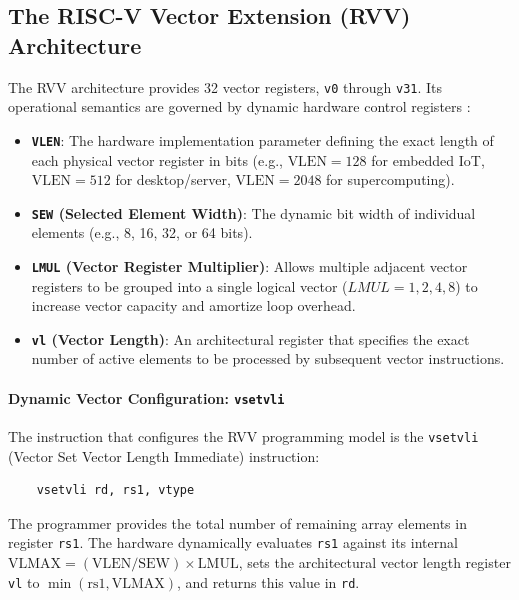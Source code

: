 \subsection{The RISC-V Vector Extension (RVV) Architecture}
The RVV architecture provides 32 vector registers, \texttt{v0} through \texttt{v31}. Its operational semantics are governed by dynamic hardware control registers  \cite{riscv-spec}:
\begin{itemize}
    \item \textbf{\texttt{VLEN}}: The hardware implementation parameter defining the exact length of each physical vector register in bits (e.g., $\text{VLEN} = 128$ for embedded IoT, $\text{VLEN} = 512$ for desktop/server, $\text{VLEN} = 2048$ for supercomputing).
    \item \textbf{\texttt{SEW} (Selected Element Width)}: The dynamic bit width of individual elements (e.g., 8, 16, 32, or 64 bits).
    \item \textbf{\texttt{LMUL} (Vector Register Multiplier)}: Allows multiple adjacent vector registers to be grouped into a single logical vector ($LMUL = 1, 2, 4, 8$) to increase vector capacity and amortize loop overhead.
    \item \textbf{\texttt{vl} (Vector Length)}: An architectural register that specifies the exact number of active elements to be processed by subsequent vector instructions.
\end{itemize}

\paragraph{Dynamic Vector Configuration: \texttt{vsetvli}}
The instruction that configures the RVV programming model is the \texttt{vsetvli} (Vector Set Vector Length Immediate) instruction:
\begin{verbatim}
    vsetvli rd, rs1, vtype
\end{verbatim}
The programmer provides the total number of remaining array elements in register \texttt{rs1}. The hardware dynamically evaluates \texttt{rs1} against its internal $\text{VLMAX} = (\text{VLEN} / \text{SEW}) \times \text{LMUL}$, sets the architectural vector length register \texttt{vl} to $\min(\text{rs1}, \text{VLMAX})$, and returns this value in \texttt{rd}.

